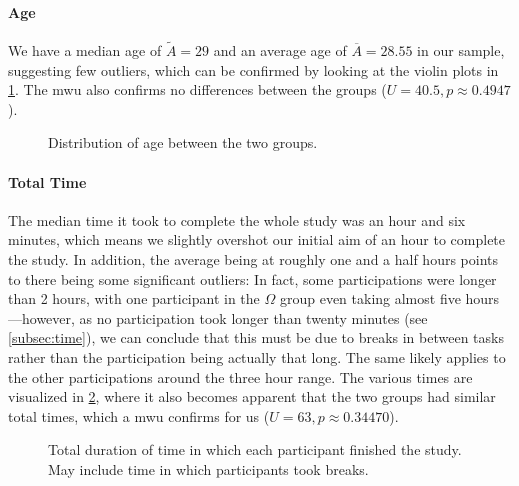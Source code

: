 \documentclass[../thesis]{subfiles}
\begin{document}
\paragraph{Age}
We have a median age of $\widetilde{A} = 29$ and an average age of $\overline{A} = 28.55$ in our sample, suggesting few outliers, which can be confirmed by looking at the violin plots in \cref{fig:dat_age}.
The \gls{mwu} also confirms no differences between the groups ($U = 40.5, p \approx 0.4947$).

\begin{figure}
	\begin{center}
	\end{center}
	\caption{Distribution of age between the two groups.}\label{fig:dat_age}
\end{figure}

\paragraph{Total Time}
The median time it took to complete the whole study was an hour and six minutes, which means we slightly overshot our initial aim of an hour to complete the study.
In addition, the average being at roughly one and a half hours points to there being some significant outliers:
In fact, some participations were longer than 2 hours, with one participant in the $\Omega$ group even taking almost five hours---however, as no participation took longer than twenty minutes (see \cref{subsec:time}), we can conclude that this must be due to breaks in between tasks rather than the participation being actually that long.
The same likely applies to the other participations around the three hour range.
The various times are visualized in \cref{fig:dat_totaltime}, where it also becomes apparent that the two groups had similar total times, which a \gls{mwu} confirms for us ($U = 63, p \approx 0.34470$).

\begin{figure}
	\begin{center}
	\end{center}
	\caption{Total duration of time in which each participant finished the study.\\
		May include time in which participants took breaks.}\label{fig:dat_totaltime}
\end{figure}
\end{document}
